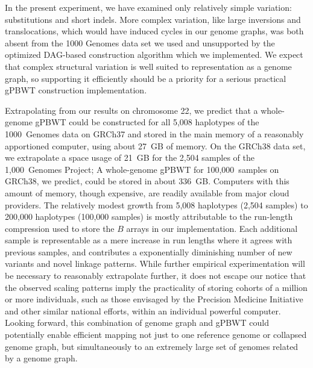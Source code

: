 \begin{sloppypar}
In the present experiment, we have examined only relatively simple variation: substitutions and short indels. More complex variation, like large inversions and translocations, which would have induced cycles in our genome graphs, was both absent from the 1000 Genomes data set we used and unsupported by the optimized DAG-based construction algorithm which we implemented. We expect that complex structural variation is well suited to representation as a genome graph, so supporting it efficiently should be a priority for a serious practical gPBWT construction implementation.
\end{sloppypar}

\begin{sloppypar}
Extrapolating from our results on chromosome 22, we predict that a whole-genome gPBWT could be constructed for all 5,008 haplotypes of the 1000~Genomes data on GRCh37 and stored in the main memory of a reasonably apportioned computer, using about 27~GB of memory. On the GRCh38 data set, we extrapolate a space usage of 21~GB for the 2,504 samples of the 1,000~Genomes Project; A whole-genome gPBWT for 100,000~samples on GRCh38, we predict, could be stored in about 336~GB. Computers with this amount of memory, though expensive, are readily available from major cloud providers. The relatively modest growth from 5,008 haplotypes (2,504 samples) to 200,000 haplotypes (100,000 samples) is mostly attributable to the run-length compression used to store the $B$ arrays in our implementation. Each additional sample is representable as a mere increase in run lengths where it agrees with previous samples, and contributes a exponentially diminishing number of new variants and novel linkage patterns. While further empirical experimentation will be necessary to reasonably extrapolate further, it does not escape our notice that the observed scaling patterns imply the practicality of storing cohorts of a million or more individuals, such as those envisaged by the Precision Medicine Initiative \cite{hudson2015precision} and other similar national efforts, within an individual powerful computer. Looking forward, this combination of genome graph and gPBWT could potentially enable efficient mapping not just to one reference genome or collapsed genome graph, but simultaneously to an extremely large set of genomes related by a genome graph.
\end{sloppypar}

